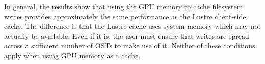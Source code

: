 In general, the results show that using the GPU memory to cache filesystem writes provides approximately the same performance as the Lustre client-side cache.  The difference is that the Lustre cache uses system memory which may not actually be available.  Even if it is, the user must ensure that writes are spread across a sufficient number of OSTs to make use of it.  Neither of these conditions apply when using GPU memory as a cache.




